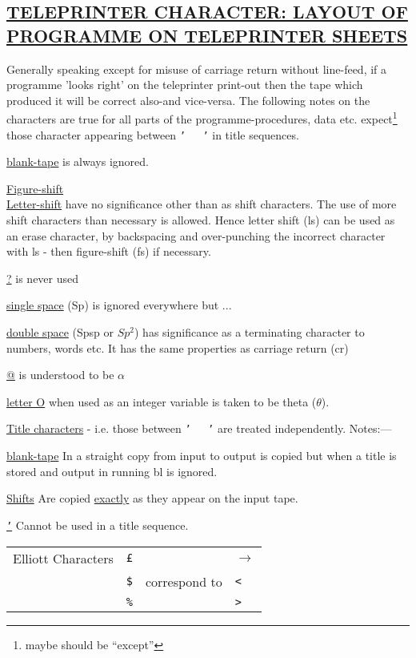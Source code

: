 \documentclass[10pt, a4paper, oneside]{article}
\newcommand{\myuline}[1]{\uline{#1}}
\newcommand{\mytt}[1]{\texttt{\scriptsize #1}}
\newcommand{\mytt}[1]{\texttt{\small #1}}
\begin{document}
\begin{multicols}{2}
\section{\myuline{TELEPRINTER CHARACTER: LAYOUT OF PROGRAMME ON TELEPRINTER SHEETS}}

Generally speaking except for misuse of carriage
return without line-feed, if a programme 'looks right'
on the teleprinter print-out then the tape which
produced it will be correct also-and vice-versa.  The
following notes on the characters are true for all parts
of the programme-procedures, data etc. expect\footnote{maybe should be ``except''} those
character appearing between \mytt{'\ \ \ '} in title sequences.

\myuline{blank-tape} is always ignored.

\myuline{Figure-shift} \\
\indent\myuline{Letter-shift} have no significance other than as
shift characters.  The use of more shift characters
than necessary is allowed.  Hence letter shift (ls) can
be used as an erase character, by backspacing and over-punching
the incorrect character with ls - then figure-shift (fs) if necessary.

\myuline{?} is never used

\myuline{single space} (Sp) is ignored everywhere but ...

\myuline{double space} (Spsp or $Sp^{2}$) has significance as a
terminating character to numbers, words etc.  It has the
same properties as carriage return (cr)

\myuline{@} is understood to be $\alpha$

\myuline{letter O} when used as an integer variable is
taken to be theta ($\theta$).

\myuline{Title characters} - i.e. those between \mytt{'\ \ \ '} are
treated independently. Notes:—

\myuline{blank-tape} In a straight copy from input to
output is copied but when a title is stored and output
in running bl is ignored.

\myuline{Shifts} Are copied \myuline{exactly} as they appear on the
input tape.

\myuline{\mytt{'}} Cannot be used in a title sequence.

\begin{tabular}{ll|l|l}
Elliott Characters & \mytt{£}  &               & $\rightarrow$ \\
                   & \mytt{\$} & correspond to & \mytt{<} \\
                   & \mytt{\%} &               & \mytt{>} \\
\end{tabular}



\end{multicols}
\end{document}
